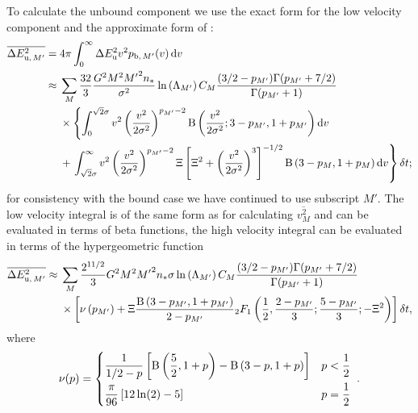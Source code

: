 To calculate the unbound component we use the exact form for the low velocity component and the approximate form of : 
\begin{align}
\overline{\Delta E^2_{\mathrm{u},\,M'}} = {} & 4\pi\int_{0}^{\infty}{\Delta E^2_\mathrm{u} v^2 p_{\mathrm{b},\,M'}(v)}\,\mathrm{d}{v} \\
 \approx {} & \sum_M\dfrac{32}{3}\dfrac{G^2M^2{M'}^2n_\ast}{\sigma^2}\ln\left(\Lambda_{M'}\right) C_M \dfrac{(3/2 - p_{M'})\Gamma(p_{M'} + 7/2)}{\Gamma(p_{M'} + 1)} \nonumber \\*
 {} & \times \left\{ \int_{0}^{\sqrt{2}\sigma}{v^2\left(\dfrac{v^2}{2\sigma^2}\right)^{p_{M'}-2}\operatorname{B}\left(\dfrac{v^2}{2\sigma^2};3-p_{M'},1+p_{M'}\right)}\,\mathrm{d}{v} \right. \nonumber \\* 
 {} & + \left. \int_{\sqrt{2}\sigma}^{\infty}{v^2\left(\dfrac{v^2}{2\sigma^2}\right)^{p_{M'}-2} \Xi\left[\Xi^2 + \left(\dfrac{v^2}{2\sigma^2}\right)^3\right]^{-1/2} \operatorname{B}\left(3-p_M,1+p_M\right)}\,\mathrm{d}{v} \right\} \delta t;
\end{align}
for consistency with the bound case we have continued to use subscript $M'$. The low velocity integral is of the same form as for calculating $\overline{v^2_M}$ and can be evaluated in terms of beta functions, the high velocity integral can be evaluated in terms of the hypergeometric function \citep[15.6.1]{Olver2010}
\begin{align}
\overline{\Delta E^2_{\mathrm{u},\,M'}} \approx {} & \sum_M\dfrac{2^{11/2}}{3}G^2M^2{M'}^2n_\ast\sigma\ln\left(\Lambda_{M'}\right) C_M \dfrac{(3/2 - p_{M'})\Gamma(p_{M'} + 7/2)}{\Gamma(p_{M'} + 1)} \nonumber \\
 & \times \left[\nu\left(p_{M'}\right) + \Xi\dfrac{\operatorname{B}\left(3-p_{M'},1+p_{M'}\right)}{2-p_{M'}}{_2F_1}\left(\dfrac{1}{2},\dfrac{2-p_{M'}}{3};\dfrac{5-p_{M'}}{3};-\Xi^2\right) \right] \delta t,
 \label{eq:E2-u}
\end{align}
where
\begin{equation}
\nu(p) = \begin{cases} \recip{1/2 - p}\left[\Beta\left(\dfrac{5}{2},1+p\right) - \Beta\left(3-p,1+p\right)\right] \vspace{1mm} & p < \recip{2} \\
\dfrac{\pi}{96}\left[12 \ln(2) - 5\right] & p = \recip{2}
\end{cases} \; .
\end{equation}

